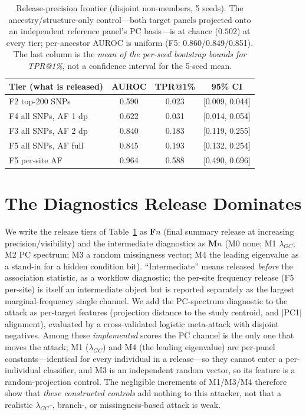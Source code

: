 \documentclass[11pt]{article}
\begin{document}
\begin{table}[t]
\centering
\caption{Release-precision frontier (disjoint non-members, 5 seeds). The
ancestry/structure-only control---both target panels projected onto an
independent reference panel's PC basis---is at chance ($0.502$) at every tier;
per-ancestor AUROC is uniform (F5: 0.860/0.849/0.851). The last column is the
\emph{mean of the per-seed bootstrap bounds for TPR@1\%}, not a confidence
interval for the 5-seed mean.}
\label{tab:frontier}
\begin{tabular}{lccc}
\toprule
Tier (what is released) & AUROC & TPR@1\% & 95\% CI \\
\midrule
F2 top-200 SNPs & 0.590 & 0.023 & [0.009, 0.044] \\
F4 all SNPs, AF 1 dp & 0.622 & 0.031 & [0.014, 0.054] \\
F3 all SNPs, AF 2 dp & 0.840 & 0.183 & [0.119, 0.255] \\
F5 all SNPs, AF full & 0.845 & 0.193 & [0.132, 0.254] \\
F5 per-site AF & 0.964 & 0.588 & [0.490, 0.696] \\
\bottomrule
\end{tabular}
\end{table}

\section{The Diagnostics Release Dominates}
\label{sec:mechanism}
We write the release tiers of Table~\ref{tab:frontier} as \textbf{F}$n$ (final
summary release at increasing precision/visibility) and the intermediate
diagnostics as \textbf{M}$n$ (M0 none; M1 $\lambda_{GC}$; M2 PC spectrum; M3 a
random missingness vector; M4 the leading eigenvalue as a stand-in for a hidden
condition bit). ``Intermediate'' means released \emph{before} the association
statistic, as a workflow diagnostic; the per-site frequency release (F5
per-site) is itself an intermediate object but is reported separately as the
largest marginal-frequency single channel. We add the PC-spectrum diagnostic to the attack as
per-target features (projection distance to the study centroid, and $|$PC1$|$
alignment), evaluated by a cross-validated logistic meta-attack with disjoint
negatives. Among these \emph{implemented} scores the PC channel is the only one
that moves the attack; M1 ($\lambda_{GC}$) and M4 (the leading eigenvalue) are
per-panel constants---identical for every individual in a release---so they
cannot enter a per-individual classifier, and M3 is an independent random
vector, so its feature is a random-projection control. The negligible increments
of M1/M3/M4 therefore show that \emph{these constructed controls} add nothing to
this attacker, not that a realistic $\lambda_{GC}$-, branch-, or
missingness-based attack is weak.
\end{document}
